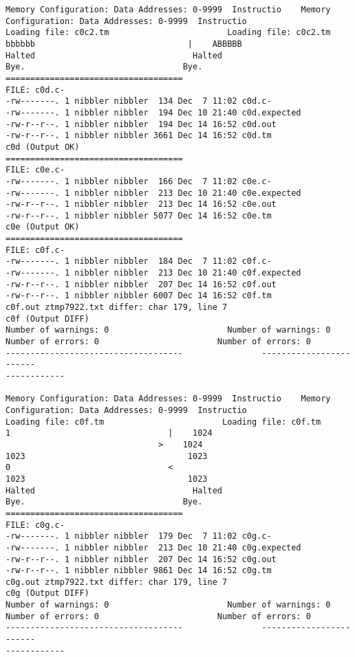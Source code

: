\documentclass[12pt]{book}
\begin{document}
\begin{lstlisting}
Memory Configuration: Data Addresses: 0-9999  Instructio    Memory 
Configuration: Data Addresses: 0-9999  Instructio
Loading file: c0c2.tm                        Loading file: c0c2.tm
bbbbbb                               |    ABBBBB
Halted                                Halted
Bye.                                Bye.
====================================
FILE: c0d.c-
-rw-------. 1 nibbler nibbler  134 Dec  7 11:02 c0d.c-
-rw-------. 1 nibbler nibbler  194 Dec 10 21:40 c0d.expected
-rw-r--r--. 1 nibbler nibbler  194 Dec 14 16:52 c0d.out
-rw-r--r--. 1 nibbler nibbler 3661 Dec 14 16:52 c0d.tm
c0d (Output OK)
====================================
FILE: c0e.c-
-rw-------. 1 nibbler nibbler  166 Dec  7 11:02 c0e.c-
-rw-------. 1 nibbler nibbler  213 Dec 10 21:40 c0e.expected
-rw-r--r--. 1 nibbler nibbler  213 Dec 14 16:52 c0e.out
-rw-r--r--. 1 nibbler nibbler 5077 Dec 14 16:52 c0e.tm
c0e (Output OK)
====================================
FILE: c0f.c-
-rw-------. 1 nibbler nibbler  184 Dec  7 11:02 c0f.c-
-rw-------. 1 nibbler nibbler  213 Dec 10 21:40 c0f.expected
-rw-r--r--. 1 nibbler nibbler  207 Dec 14 16:52 c0f.out
-rw-r--r--. 1 nibbler nibbler 6007 Dec 14 16:52 c0f.tm
c0f.out ztmp7922.txt differ: char 179, line 7
c0f (Output DIFF)
Number of warnings: 0                        Number of warnings: 0
Number of errors: 0                        Number of errors: 0
------------------------------------                ------------------------
------------

Memory Configuration: Data Addresses: 0-9999  Instructio    Memory 
Configuration: Data Addresses: 0-9999  Instructio
Loading file: c0f.tm                        Loading file: c0f.tm
1                                |    1024 
                               >    1024 
1023                                 1023 
0                                <
1023                                 1023 
Halted                                Halted
Bye.                                Bye.
====================================
FILE: c0g.c-
-rw-------. 1 nibbler nibbler  179 Dec  7 11:02 c0g.c-
-rw-------. 1 nibbler nibbler  213 Dec 10 21:40 c0g.expected
-rw-r--r--. 1 nibbler nibbler  207 Dec 14 16:52 c0g.out
-rw-r--r--. 1 nibbler nibbler 9861 Dec 14 16:52 c0g.tm
c0g.out ztmp7922.txt differ: char 179, line 7
c0g (Output DIFF)
Number of warnings: 0                        Number of warnings: 0
Number of errors: 0                        Number of errors: 0
------------------------------------                ------------------------
------------


\end{lstlisting}
\end{document}
